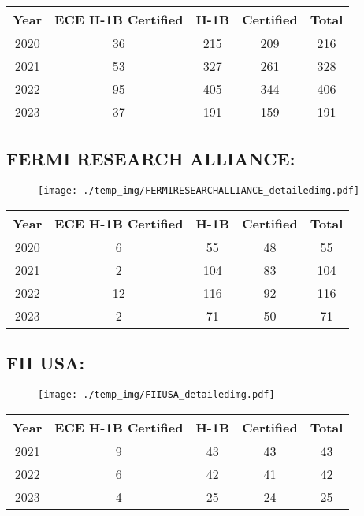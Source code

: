 \documentclass{article}%
\begin{document}
%
\begin{longtable}{c|c|c|c|c}%
\hline%
Year&ECE H{-}1B Certified&H{-}1B&Certified&Total\\%
\hline%
2020&36&215&209&216\\%
\hline%
2021&53&327&261&328\\%
\hline%
2022&95&405&344&406\\%
\hline%
2023&37&191&159&191\\%
\hline%
\end{longtable}

%
\newpage%
\subsection{FERMI RESEARCH ALLIANCE:}%
\label{subsec:FERMIRESEARCHALLIANCE}%
\label{FERMIRESEARCHALLIANCEdetailed}%


\begin{figure}[htbp]%
\centering%
\texttt{[image: ./temp\_img/FERMIRESEARCHALLIANCE\_detailedimg.pdf]}%
\end{figure}

%
\begin{longtable}{c|c|c|c|c}%
\hline%
Year&ECE H{-}1B Certified&H{-}1B&Certified&Total\\%
\hline%
2020&6&55&48&55\\%
\hline%
2021&2&104&83&104\\%
\hline%
2022&12&116&92&116\\%
\hline%
2023&2&71&50&71\\%
\hline%
\end{longtable}

%
\newpage%
\subsection{FII USA:}%
\label{subsec:FIIUSA}%
\label{FIIUSAdetailed}%


\begin{figure}[htbp]%
\centering%
\texttt{[image: ./temp\_img/FIIUSA\_detailedimg.pdf]}%
\end{figure}

%
\begin{longtable}{c|c|c|c|c}%
\hline%
Year&ECE H{-}1B Certified&H{-}1B&Certified&Total\\%
\hline%
2021&9&43&43&43\\%
\hline%
2022&6&42&41&42\\%
\hline%
2023&4&25&24&25\\%
\hline%
\end{longtable}
\end{document}
